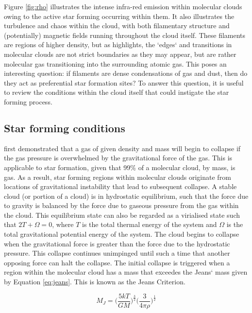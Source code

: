 \documentclass{report}
\begin{document}
Figure \ref{fig:rho} illustrates the intense infra-red emission within molecular clouds owing to the active star forming occurring within them. It also illustrates the turbulence and chaos within the cloud, with both filamentary structure and (potentially) magnetic fields running throughout the cloud itself. These filaments are regions of higher density, but as \textcite{evo-mol} highlights, the `edges` and transitions in molecular clouds are not strict boundaries as they may appear, but are rather molecular gas transitioning into the surrounding atomic gas. This poses an interesting question: if filaments are dense condensations of gas and dust, then do they act as preferential star formation sites? To answer this question, it is useful to review the conditions within the cloud itself that could instigate the star forming process.

\subsection{Star forming conditions} \label{sec:conditions}
\textcite{jeans} first demonstrated that a gas of given density and mass will begin to collapse if the gas pressure is overwhelmed by the gravitational force of the gas. This is applicable to star formation, given that 99\% of a molecular cloud, by mass, is gas. As a result, star forming regions within molecular clouds originate from locations of gravitational instability that lead to subsequent collapse. A stable cloud (or portion of a cloud) is in hydrostatic equilibrium, such that the force due to gravity is balanced by the force due to gaseous pressure from the gas within the cloud. This equilibrium state can also be regarded as a virialised state such that $2T+\Omega=0$, where $T$ is the total thermal energy of the system and $\Omega$ is the total gravitational potential energy of the system. The cloud begins to collapse when the gravitational force is greater than the force due to the hydrostatic pressure. This collapse continues unimpinged until such a time that another opposing force can halt the collapse. The initial collapse is triggered when a region within the molecular cloud has a mass that exceedes the Jeans` mass given by Equation \ref{eq:jeans}. This is known as the Jeans Criterion.

\begin{equation}
  M_{J} = \Bigg( \frac{5kT}{GM} \Bigg )^\frac{3}{2} \Bigg( \frac{3}{4\pi\rho} \Bigg )^\frac{1}{2}
  \label{eq:jeans}
\end{equation}
\end{document}

